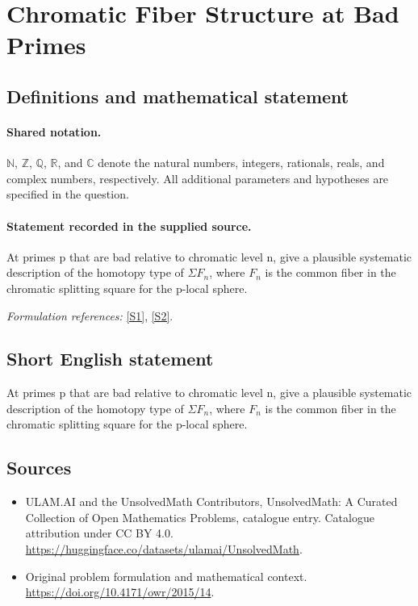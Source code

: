 \documentclass[11pt]{article}
\newcommand{\sref}[2]{\hyperlink{source:#1:#2}{[S#2]}}
\begin{document}
\section{Chromatic Fiber Structure at Bad Primes}\label{statement}

\subsection{Definitions and mathematical statement}

\paragraph{Shared notation.}$\mathbb N$, $\mathbb Z$, $\mathbb Q$, $\mathbb R$, and $\mathbb C$ denote the natural numbers, integers, rationals, reals, and complex numbers, respectively. All additional parameters and hypotheses are specified in the question.


\paragraph{Statement recorded in the supplied source.}
At primes p that are bad relative to chromatic level n, give a plausible systematic description of the homotopy type of $\Sigma F_n$, where $F_n$ is the common fiber in the chromatic splitting square for the p-local sphere.
\par\smallskip\textit{Formulation references:} \sref{statement}{1}, \sref{statement}{2}.
\subsection{Short English statement}
At primes p that are bad relative to chromatic level n, give a plausible systematic description of the homotopy type of $\Sigma F_n$, where $F_n$ is the common fiber in the chromatic splitting square for the p-local sphere.
\subsection{Sources}
\begin{itemize}
\item[\hypertarget{source:statement:1}{S1}] ULAM.AI and the UnsolvedMath Contributors, UnsolvedMath: A Curated Collection of Open Mathematics Problems, catalogue entry. Catalogue attribution under CC BY 4.0.
\url{https://huggingface.co/datasets/ulamai/UnsolvedMath}.
\item[\hypertarget{source:statement:2}{S2}] Original problem formulation and mathematical context.
\url{https://doi.org/10.4171/owr/2015/14}.
\end{itemize}
\label{end:statement}
\end{document}
